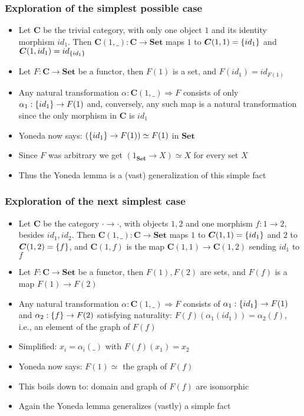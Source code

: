 \documentclass[handout]{beamer}
\newcommand{\To}{\Rightarrow}
\newcommand{\bfsf}[1]{{\boldsymbol{#1}}}
\newcommand{\Set}{\bfsf{Set}}
\newcommand{\CC}{\bfsf{C}}
\begin{document}
\frame
  {   
    \frametitle{Exploration of the simplest possible case}\label{Yon:Triv}

 \begin{itemize}[<+->]
\item Let $\CC$ be the trivial category, with only one object $1$ and
 its identity morphism $id_1$. Then $\CC(1,\_):\CC\to\Set$ maps
$1$ to $\CC(1,1) = \set{id_1}$ and $\CC(1,id_1) = id_{\set{id_1}}$
\item Let $F:\CC\to\Set$ be a functor, then $F(1)$ is a set, and
$F(id_1) = id_{F(1)}$
\item Any natural transformation $\alpha: \CC(1,\_)\To F$ consists of
only $\alpha_1: \{id_1\} \to F(1)$ and,
conversely, any such map is a natural transformation
since the only morphism in $\CC$ is $id_1$
\item Yoneda now says:  $(\{id_1\} \to F(1)) \simeq F(1)$ in $\Set$
\item Since $F$ was arbitrary we get  $(1_\Set \to X) \simeq X$ for every set $X$
\item Thus the Yoneda lemma is a (vast) generalization of this simple fact
 \end{itemize}

 }

\frame
  {   
    \frametitle{Exploration of the next simplest case}\label{Yon:Triv}

 \begin{itemize}[<+->]
\item Let $\CC$ be the category ${\cdot}{\to}{\cdot}$, with objects $1,2$ and
one morphism $f:1\to 2$, besides $id_1,id_2$. Then $\CC(1,\_):\CC\to\Set$ maps
$1$ to $\CC(1,1) = \set{id_1}$ and $2$ to $\CC(1,2) = \set{f}$, and
$\CC(1,f)$ is the map $\CC(1,1)\to\CC(1,2)$ sending $id_1$ to $f$  
\item Let $F:\CC\to\Set$ be a functor, then $F(1), F(2)$ are sets, and
$F(f)$ is a map ${F(1)}\to{F(2)}$
\item Any natural transformation $\alpha: \CC(1,\_)\To F$ consists of
$\alpha_1: \{id_1\} \to F(1)$ and $\alpha_2: \{f\} \to F(2)$ satisfying 
naturality: $F(f)(\alpha_1(id_1)) = \alpha_2(f)$, i.e., an element of the graph of $F(f)$
\item Simplified: $x_i =\alpha_i(\_)$ with %
$F(f)(x_1) = x_2$
\item Yoneda now says:   $F(1) \simeq{}$ the graph of $F(f)$
\item This boils down to: domain and graph of $F(f)$ are isomorphic
\item Again  the Yoneda lemma generalizes (vastly) a simple fact
 \end{itemize}

 }
\end{document}
